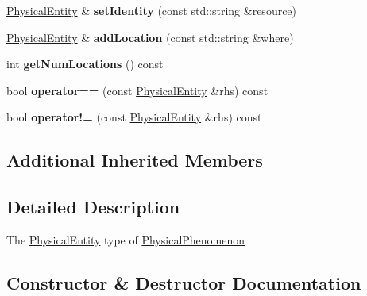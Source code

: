 \begin{DoxyCompactItemize}
\mbox{\label{classomexmeta_1_1PhysicalEntity_a4d4c3ee9572b19e44e79a44f18f1ac31}} 
\hyperlink{classomexmeta_1_1PhysicalEntity}{Physical\+Entity} \& {\bfseries set\+Identity} (const std\+::string \&resource)
\item 
\mbox{\label{classomexmeta_1_1PhysicalEntity_a82e77be3327c537b2426b571afaa5045}} 
\hyperlink{classomexmeta_1_1PhysicalEntity}{Physical\+Entity} \& {\bfseries add\+Location} (const std\+::string \&where)
\item 
\mbox{\label{classomexmeta_1_1PhysicalEntity_a33559c90dbe3e3be1b71898ab9a5bfa4}} 
int {\bfseries get\+Num\+Locations} () const
\item 
\mbox{\label{classomexmeta_1_1PhysicalEntity_a5f54e5c2df0fd5c3b9121e1426b23af6}} 
bool {\bfseries operator==} (const \hyperlink{classomexmeta_1_1PhysicalEntity}{Physical\+Entity} \&rhs) const
\item 
\mbox{\label{classomexmeta_1_1PhysicalEntity_afee546a420f16e128ed1add9fec35b4f}} 
bool {\bfseries operator!=} (const \hyperlink{classomexmeta_1_1PhysicalEntity}{Physical\+Entity} \&rhs) const
\end{DoxyCompactItemize}
\subsection*{Additional Inherited Members}


\subsection{Detailed Description}
The \hyperlink{classomexmeta_1_1PhysicalEntity}{Physical\+Entity} type of \hyperlink{classomexmeta_1_1PhysicalPhenomenon}{Physical\+Phenomenon} 

\subsection{Constructor \& Destructor Documentation}
\mbox{\label{classomexmeta_1_1PhysicalEntity_a9d29348a080c64f91ff6ec184fd45ece}} 
